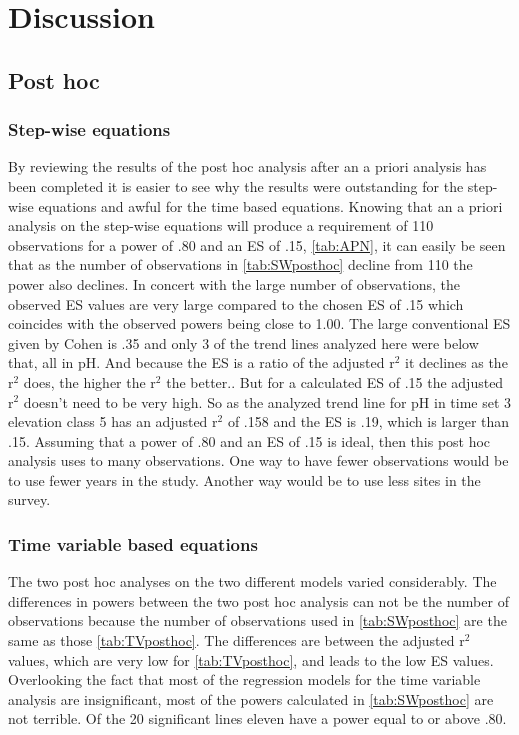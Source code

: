 \section{Discussion}

\subsection{Post hoc}

\subsubsection{Step-wise equations}

By reviewing the results of the post hoc analysis after an a priori analysis has been completed it is easier to see why the results were outstanding for the step-wise equations and awful for the time based equations.
Knowing that an a priori analysis on the step-wise equations will produce a requirement of 110 observations for a power of .80 and an ES of .15, \autoref{tab:APN}, it can easily be seen that as the number of observations in \autoref{tab:SWposthoc} decline from 110 the power also declines.
In concert with the large number of observations, the observed ES values are very large compared to the chosen ES of .15 which coincides with the observed powers being close to 1.00.
The large conventional ES given by Cohen is .35 and only 3 of the trend lines analyzed here were below that, all in pH.
And because the ES is a ratio of the adjusted r$^2$ it declines as the r$^2$ does, the higher the r$^2$ the better..
But for a calculated ES of .15 the adjusted r$^2$ doesn't need to be very high.
So as the analyzed trend line for pH in time set 3 elevation class 5 has an adjusted r$^2$ of .158 and the ES is .19, which is larger than .15.
Assuming that a power of .80 and an ES of .15 is ideal, then this post hoc analysis uses to many observations.
One way to have fewer observations would be to use fewer years in the study.
Another way would be to use less sites in the survey.

\subsubsection{Time variable based equations}%
The two post hoc analyses on the two different models varied considerably.
The differences in powers between the two post hoc analysis can not be the number of observations because the number of observations used in \autoref{tab:SWposthoc} are the same as those \autoref{tab:TVposthoc}.
The differences are between the adjusted r$^2$ values, which are very low for \autoref{tab:TVposthoc}, and leads to the low ES values.
Overlooking the fact that most of the regression models for the time variable analysis are insignificant, most of the powers calculated in \autoref{tab:SWposthoc} are not terrible.
Of the 20 significant lines eleven have a power equal to or above .80.

